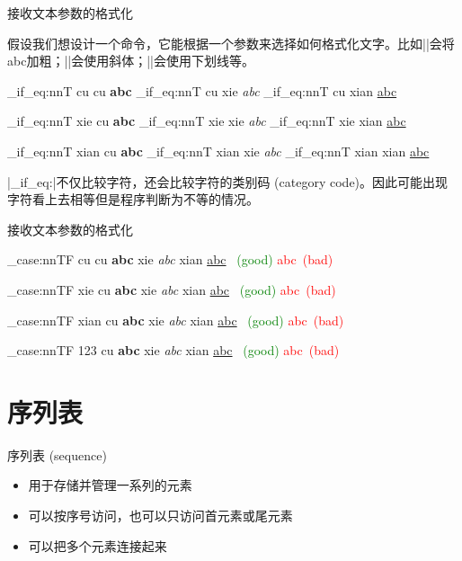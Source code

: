 \documentclass[aspectratio=169]{beamer}
\begin{document}
\begin{frame}[fragile]{接收文本参数的格式化}

假设我们想设计一个命令，它能根据一个参数来选择如何格式化文字。比如\texinl||会将abc加粗；\texinl||会使用斜体；\texinl||会使用下划线等。

\begin{texcode**}
\ExplSyntaxOn
\newcommand{\fmt}[2]{
    \str_if_eq:nnT {#1} {cu} {\textbf{#2}}
    \str_if_eq:nnT {#1} {xie} {\textit{#2}}
    \str_if_eq:nnT {#1} {xian} {\underline{#2}}
}
\par\fmt{cu}{abc}
\par\fmt{xie}{abc}
\par\fmt{xian}{abc}
\ExplSyntaxOff
\end{texcode**}

\texinl|\tl_if_eq:|不仅比较字符，还会比较字符的类别码 (category code)。因此可能出现字符看上去相等但是程序判断为不等的情况。

\end{frame}


\begin{frame}[fragile]{接收文本参数的格式化}


\begin{texcode**}[0.2]
\ExplSyntaxOn
\newcommand{\fmt}[2]{
    \str_case:nnTF {#1} {
        {cu} {\textbf{#2}}
        {xie} {\textit{#2}}
        {xian} {\underline{#2}}
    }{
        \textcolor{green}{\ (good)}
    }{
        \textcolor{red}{#2\ (bad)}
    }
}
\par\fmt{cu}{abc}
\par\fmt{xie}{abc}
\par\fmt{xian}{abc}
\par\fmt{123}{abc}
\ExplSyntaxOff
\end{texcode**}

\end{frame}


\section{序列表}


\begin{frame}[fragile]{序列表 (sequence)}

\begin{itemize}
\item 用于存储并管理一系列的元素
\item 可以按序号访问，也可以只访问首元素或尾元素
\item 可以把多个元素连接起来
\end{itemize}

\end{frame}
\end{document}
